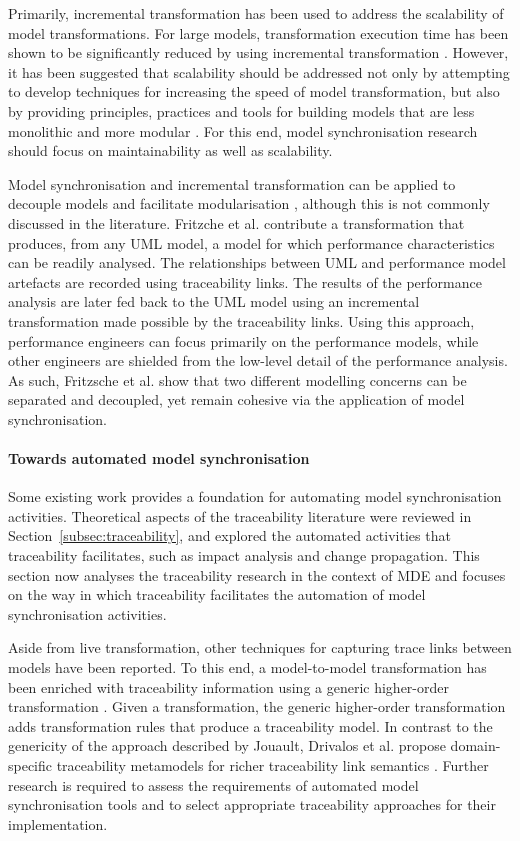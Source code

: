 Primarily, incremental transformation has been used to address the scalability of model transformations. For large models, transformation execution time has been shown to be significantly reduced by using incremental transformation \cite{hearnden06incremental}. However, \cc it has been suggested that scalability should be addressed not only by attempting to develop techniques for increasing the speed of model transformation, but also by providing principles, practices and tools for building models that are less monolithic and more modular \cite{kolovos08scalability}. For this end, model synchronisation research should focus on maintainability as well as scalability.

Model \cc synchronisation and incremental transformation can be applied to decouple models and facilitate modularisation \cite{fritzsche08tracing}, although this is not commonly discussed in the literature. Fritzche et al. contribute a transformation that produces, from any UML model, a model for which performance characteristics can be readily analysed. The relationships between UML and performance model artefacts are recorded using traceability links. The results of the performance analysis are later fed back to the UML model using an incremental transformation made possible by the traceability links. Using this approach, performance engineers can focus primarily on the performance models, while other engineers are shielded from the low-level detail of the performance analysis. As such, Fritzsche et al. show that two different modelling concerns can be separated and decoupled, yet remain cohesive via the application of model synchronisation.

\paragraph{Towards automated model synchronisation}
Some existing work provides a foundation for automating model synchronisation activities. Theoretical aspects of the traceability literature were reviewed in Section~\ref{subsec:traceability}, and explored the automated activities that traceability facilitates, such as impact analysis and change propagation.  This section now analyses the traceability research in the context of MDE and focuses on the way in which traceability facilitates the automation of model synchronisation activities.

Aside from live transformation, other techniques for capturing trace links between models have been reported. To \cc this end, a model-to-model transformation has been enriched with traceability information using a generic higher-order transformation \cite{jouault05loosely}. Given a transformation, the generic higher-order transformation adds transformation rules that produce a traceability model. In \cc contrast to the genericity of the approach described by Jouault, Drivalos et al. propose domain-specific traceability metamodels for richer traceability link semantics \cite{drivalos08rigorously}. Further research is required to assess the requirements of automated model synchronisation tools and to select appropriate traceability approaches for their implementation.

